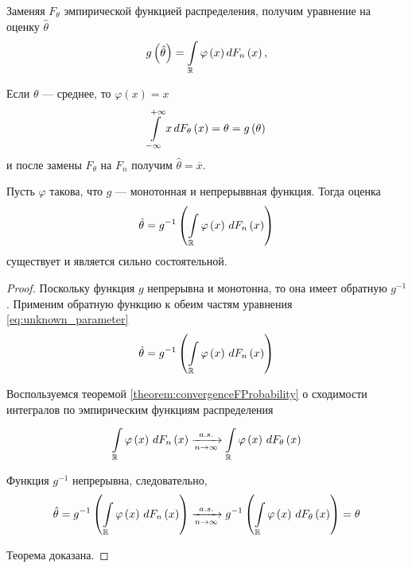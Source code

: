 Заменяя $F_{\theta}$ эмпирической функцией распределения, получим уравнение
на оценку $\hat{\theta}$
\begin{equation}\label{eq:unknown_parameter}
  g\left(\hat{\theta}\right)
    = \int\limits_{\mathbb{R}}\varphi\left(x\right)d\cdfn{x},
\end{equation}

\begin{example}
  Если $\theta$ --- среднее, то $\varphi\left(x\right)=x$
  \begin{equation*}
    \integral{-\infty}{+ \infty}{\cdfof{\theta}{x}}{x}
    = \theta
    = g\left(\theta\right)
  \end{equation*}
  и после замены $F_\theta$ на $F_n$ получим $\hat{\theta} = \overline{x}$.
\end{example}
\begin{theorem}
  Пусть $\varphi$ такова, что $g$ --- монотонная и непрерыввная функция.
  Тогда оценка
  \begin{equation*}
    \hat{\theta}
    = g^{-1}\left( \integrall{\mathbb{R}}{d\cdfn{x}}{
      \varphi\left( x \right)} \right)
  \end{equation*}
  существует и является сильно состоятельной.
\end{theorem}
\begin{proof}
  Поскольку функция $g$ непрерывна и монотонна,
  то она имеет обратную $g^{-1}$.
  Применим обратную функцию к обеим частям уравнения
  \eqref{eq:unknown_parameter}
  \begin{equation*}
    \hat{\theta}
    = g^{-1}\left( \integrall{\mathbb{R}}{d\cdfn{x}}{\varphi\left( x \right)}
        \right)
  \end{equation*}

  Воспользуемся теоремой \ref{theorem:convergenceFProbability} о сходимости
  интегралов по эмпирическим функциям распределения
  \begin{equation*}
    \integrall{\mathbb{R}}{d\cdfn{x}}{\varphi\left( x \right)}
    \acovergence \integrall{\mathbb{R}}{d\cdfof{\theta}{x}}{
        \varphi\left( x \right)}
  \end{equation*}

  Функция $g^{-1}$ непрерывна, следовательно,
  \begin{equation*}
  \hat{\theta}
  = g^{-1}\left( \integrall{\mathbb{R}}{
    d\cdfn{x}}{\varphi\left( x \right)} \right)
  \acovergence
    g^{-1}\left( \integrall{\mathbb{R}}{
      d\cdfof{\theta}{x}}{\varphi\left( x \right)} \right)
  = \theta
  \end{equation*}

  Теорема доказана.
\end{proof}

